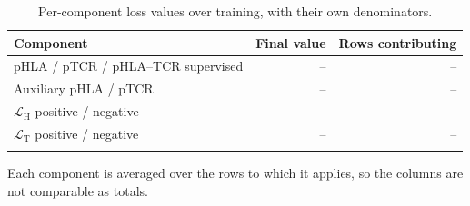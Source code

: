 \documentclass[webpdf,modern,large,namedate]{oup-authoring-template}
\theoremstyle{thmstyleone}
\theoremstyle{thmstyletwo}
\theoremstyle{thmstylethree}
\newcommand{\NA}{--}
\newcommand{\PH}{pHLA}
\newcommand{\PT}{pTCR}
\newcommand{\PHT}{pHLA--TCR}
\begin{document}
\begin{appendices}
\begin{table}[!t]
\caption{Per-component loss values over training, with their own
denominators.\label{tab:app:loss}}
\begin{tabular*}{\columnwidth}{@{\extracolsep\fill}lrr@{\extracolsep\fill}}
\toprule
Component & Final value & Rows contributing\\
\midrule
\PH{} / \PT{} / \PHT{} supervised & \NA & \NA\\
Auxiliary \PH{} / \PT{}           & \NA & \NA\\
$\mathcal{L}_{\mathrm{H}}$ positive / negative & \NA & \NA\\
$\mathcal{L}_{\mathrm{T}}$ positive / negative & \NA & \NA\\
\botrule
\end{tabular*}
\begin{tablenotes}%
\item Each component is averaged over the rows to which it applies, so the
columns are not comparable as totals.
\end{tablenotes}
\end{table}

\end{appendices}
\end{document}
